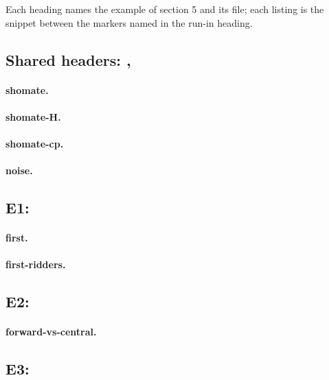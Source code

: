 Each heading names the example of  section 5 and its file; each listing is the snippet between the
markers named in the run-in heading.

\subsection*{Shared headers: , }
\paragraph{shomate.} 
\paragraph{shomate-H.} 
\paragraph{shomate-cp.} 
\paragraph{noise.} 

\subsection*{E1: }
\paragraph{first.} 
\paragraph{first-ridders.} 

\subsection*{E2: }
\paragraph{forward-vs-central.} 

\subsection*{E3: }
